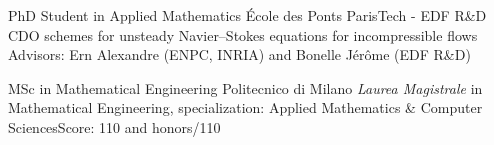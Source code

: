 \documentclass[english]{RMcv}
\begin{document}






%
%


%
        {PhD Student in Applied Mathematics}%
        {École des Ponts ParisTech - EDF R\&D}%
        {CDO schemes for unsteady Navier--Stokes equations for incompressible flows}%
        {Advisors: Ern Alexandre (ENPC, INRIA) and Bonelle J\'er\^ome (EDF R\&D)}

%
        {MSc in Mathematical Engineering}%
        {Politecnico di Milano}%
        {\emph{Laurea Magistrale} in Mathematical Engineering, specialization: Applied Mathematics \& Computer Sciences}{Score: 110 and honors/110}
\end{document}
